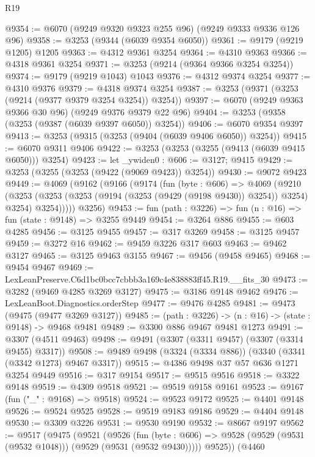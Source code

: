 \begin{lexlean}{R19}
\begin{coremodule}
@9354 := @6070 (@9249 @9320 @9323 @255 @96) (@9249 @9333 @9336 @126 @96)
@9358 := @3253 (@9344 (@6039 @9354 @6050))
@9361 := @9179 (@9219 @1205) @1205
@9363 := @4312 @9361 @3254
@9364 := @4310 @9363
@9366 := @4318 @9361 @3254
@9371 := @3253 (@9214 (@9364 @9366 @3254 @3254))
@9374 := @9179 (@9219 @1043) @1043
@9376 := @4312 @9374 @3254
@9377 := @4310 @9376
@9379 := @4318 @9374 @3254
@9387 := @3253 (@9371 (@3253 (@9214 (@9377 @9379 @3254 @3254)) @3254))
@9397 := @6070 (@9249 @9363 @9366 @30 @96) (@9249 @9376 @9379 @22 @96)
@9404 := @3253 (@9358 (@3253 (@9387 (@6039 @9397 @6050)) @3254))
@9406 := @6070 @9354 @9397
@9413 := @3253 (@9315 (@3253 (@9404 (@6039 @9406 @6050)) @3254))
@9415 := @6070 @9311 @9406
@9422 := @3253 (@3253 (@3255 (@9413 (@6039 @9415 @6050))) @3254)
@9423 := let _ywiden0 : @606 := @3127; @9415
@9429 := @3253 (@3255 (@3253 (@9422 (@9069 @9423)) @3254))
@9430 := @9072 @9423
@9449 := @4069
    (@9162
      (@9166
        (@9174
          (fun (byte : @606) =>
          @4069
            (@9210
              (@3253
                (@3253 (@3253 (@9194 (@3253 (@9429 (@9198 @9430)) @3254)) @3254) @3254)
                @3254)))))
      @3256)
@9453 := fun (path : @3226) => fun (n : @16) => fun (state : @9148) => @3255 @9449
@9454 := @3264 @886
@9455 := @603 @4285
@9456 := @3125 @9455
@9457 := @317 @3269
@9458 := @3125 @9457
@9459 := @3272 @16
@9462 := @9459 @3226 @317 @603
@9463 := @9462 @3127
@9465 := @3125 @9463 @3155
@9467 := @9456 (@9458 @9465)
@9468 := @9454 @9467
@9469 := LexLeanPreserve.C6d1bc0bcc7cbbb3a169c4e838883ff45.R19.__fits_30
@9473 := @3282 (@9469 @4285 @3269 @3127)
@9475 := @3186 @9148 @9462
@9476 := LexLeanBoot.Diagnostics.orderStep
@9477 := @9476 @4285
@9481 := @9473 (@9475 (@9477 @3269 @3127))
@9485 := (path : @3226) -> (n : @16) -> (state : @9148) -> @9468 @9481
@9489 := @3300 @886 @9467 @9481 @1273
@9491 := @3307 (@4511 @9463)
@9498 := @9491 (@3307 (@3311 @9457) (@3307 (@3314 @9455) @3317))
@9508 := @9489 @9498 (@3324 (@3334 @886)) (@3340 (@3341 (@3342 @1273) @9467 @3317))
@9515 := @4386 @9498 @37 @57 @636 @1271 @3254 @9449
@9516 := @317 @9154
@9517 := @9515 @9516
@9518 := @3322 @9148
@9519 := @4309 @9518
@9521 := @9519 @9158 @9161
@9523 := @9167 (fun ("_" : @9168) => @9518)
@9524 := @9523 @9172
@9525 := @4401 @9148
@9526 := @9524 @9525
@9528 := @9519 @9183 @9186
@9529 := @4404 @9148
@9530 := @3309 @3226
@9531 := @9530 @9190
@9532 := @8667 @9197
@9562 := @9517
    (@9475
      (@9521
        (@9526
          (fun (byte : @606) => @9528 (@9529 (@9531 (@9532 @1048))) (@9529 (@9531 (@9532 @9430)))))
        @9525))
    (@4460

\end{coremodule}
\end{lexlean}
